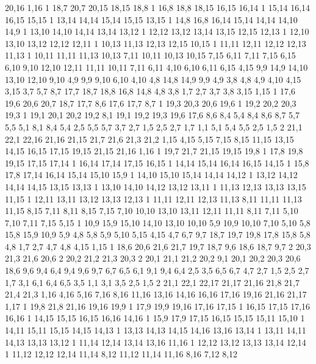 20,16
1,16
1%
18,7
20,7
20,15
18,15
18,8
1%
16,8
18,8
18,15
16,15
16,14
1%
15,14
16,14
16,15
15,15
1%
13,14
14,14
15,14
15,15
13,15
1%
14,8
16,8
16,14
15,14
14,14
14,10
14,9
1%
13,10
14,10
14,14
13,14
13,12
1%
12,12
13,12
13,14
13,15
12,15
12,13
1%
12,10
13,10
13,12
12,12
12,11
1%
10,13
11,13
12,13
12,15
10,15
1%
11,11
12,11
12,12
12,13
11,13
1%
10,11
11,11
11,13
10,13
%
7,11
10,11
10,13
10,15
7,15
%
6,11
7,11
7,15
6,15
%
6,10
9,10
12,10
12,11
11,11
10,11
7,11
6,11
%
4,10
6,10
6,11
6,15
4,15
%
9,9
14,9
14,10
13,10
12,10
9,10
%
4,9
9,9
9,10
6,10
4,10
%
4,8
14,8
14,9
9,9
4,9
%
3,8
4,8
4,9
4,10
4,15
3,15
%
3,7
5,7
8,7
17,7
18,7
18,8
16,8
14,8
4,8
3,8
%
1,7
2,7
3,7
3,8
3,15
1,15
1%
17,6
19,6
20,6
20,7
18,7
17,7
%
8,6
17,6
17,7
8,7
1%
19,3
20,3
20,6
19,6
1%
19,2
20,2
20,3
19,3
1%
19,1
20,1
20,2
19,2
%
8,1
19,1
19,2
19,3
19,6
17,6
8,6
8,4
%
5,4
8,4
8,6
8,7
5,7
5,5
%
5,1
8,1
8,4
5,4
%
2,5
5,5
5,7
3,7
2,7
%
1,5
2,5
2,7
1,7
%
1,1
5,1
5,4
5,5
2,5
1,5
2%
21,1
22,1
22,16
21,16
21,15
21,7
21,6
21,3
21,2
%
1,15
4,15
5,15
7,15
8,15
11,15
13,15
14,15
16,15
17,15
19,15
21,15
21,16
1,16
1%
19,7
21,7
21,15
19,15
19,8
1%
17,8
19,8
19,15
17,15
17,14
1%
16,14
17,14
17,15
16,15
1%
14,14
15,14
16,14
16,15
14,15
1%
15,8
17,8
17,14
16,14
15,14
15,10
15,9
1%
14,10
15,10
15,14
14,14
14,12
1%
13,12
14,12
14,14
14,15
13,15
13,13
1%
13,10
14,10
14,12
13,12
13,11
1%
11,13
12,13
13,13
13,15
11,15
1%
12,11
13,11
13,12
13,13
12,13
1%
11,11
12,11
12,13
11,13
%
8,11
11,11
11,13
11,15
8,15
%
7,11
8,11
8,15
7,15
%
7,10
10,10
13,10
13,11
12,11
11,11
8,11
7,11
%
5,10
7,10
7,11
7,15
5,15
1%
10,9
15,9
15,10
14,10
13,10
10,10
%
5,9
10,9
10,10
7,10
5,10
%
5,8
15,8
15,9
10,9
5,9
%
4,8
5,8
5,9
5,10
5,15
4,15
%
4,7
6,7
9,7
18,7
19,7
19,8
17,8
15,8
5,8
4,8
%
1,7
2,7
4,7
4,8
4,15
1,15
1%
18,6
20,6
21,6
21,7
19,7
18,7
%
9,6
18,6
18,7
9,7
2%
20,3
21,3
21,6
20,6
2%
20,2
21,2
21,3
20,3
2%
20,1
21,1
21,2
20,2
%
9,1
20,1
20,2
20,3
20,6
18,6
9,6
9,4
%
6,4
9,4
9,6
9,7
6,7
6,5
%
6,1
9,1
9,4
6,4
%
2,5
3,5
6,5
6,7
4,7
2,7
%
1,5
2,5
2,7
1,7
%
3,1
6,1
6,4
6,5
3,5
%
1,1
3,1
3,5
2,5
1,5
2%
21,1
22,1
22,17
21,17
21,16
21,8
21,7
21,4
21,3
%
1,16
4,16
5,16
7,16
8,16
11,16
13,16
14,16
16,16
17,16
19,16
21,16
21,17
1,17
1%
19,8
21,8
21,16
19,16
19,9
1%
17,9
19,9
19,16
17,16
17,15
1%
16,15
17,15
17,16
16,16
1%
14,15
15,15
16,15
16,16
14,16
1%
15,9
17,9
17,15
16,15
15,15
15,11
15,10
1%
14,11
15,11
15,15
14,15
14,13
1%
13,13
14,13
14,15
14,16
13,16
13,14
1%
13,11
14,11
14,13
13,13
13,12
1%
11,14
12,14
13,14
13,16
11,16
1%
12,12
13,12
13,13
13,14
12,14
1%
11,12
12,12
12,14
11,14
%
8,12
11,12
11,14
11,16
8,16
%
7,12
8,12
